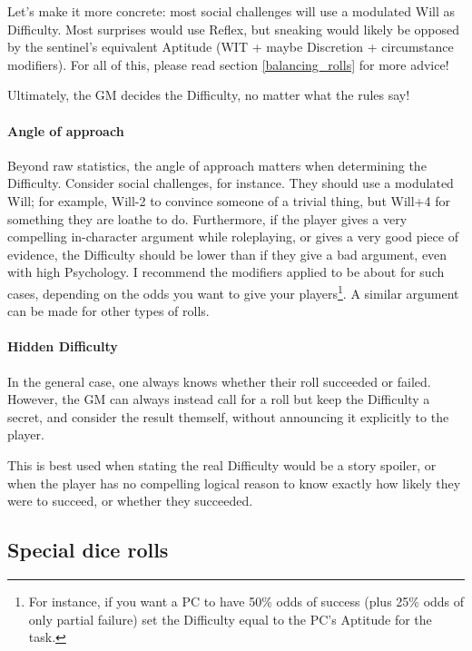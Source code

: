 Let's make it more concrete: most social challenges will use a modulated Will as Difficulty. Most surprises would use Reflex, but sneaking would likely be opposed by the sentinel's equivalent Aptitude (WIT + maybe Discretion + circumstance modifiers). For all of this, please read section \ref{balancing_rolls} for more advice!

\begin{rpg-examplebox}
	Ultimately, the GM decides the Difficulty, no matter what the rules say!
\end{rpg-examplebox}

\paragraph{Angle of approach}

Beyond raw statistics, the angle of approach matters when determining the Difficulty. Consider social challenges, for instance. They should use a modulated Will; for example, Will-2 to convince someone of a trivial thing, but Will+4 for something they are loathe to do. Furthermore, if the player gives a very compelling in-character argument while roleplaying, or gives a very good piece of evidence, the Difficulty should be lower than if they give a bad argument, even with high Psychology. I recommend the modifiers applied to be about  for such cases, depending on the odds you want to give your players\footnote{For instance, if you want a PC to have 50\% odds of success (plus 25\% odds of only partial failure) set the Difficulty equal to the PC's Aptitude for the task.}. A similar argument can be made for other types of rolls.


\paragraph{Hidden Difficulty} 

In the general case, one always knows whether their roll succeeded or failed. However, the GM can always instead call for a roll but keep the Difficulty a secret, and consider the result themself, without announcing it explicitly to the player. 

This is best used when stating the real Difficulty would be a story spoiler, or when the player has no compelling logical reason to know exactly how likely they were to succeed, or whether they succeeded.

\subsection{Special dice rolls} 

